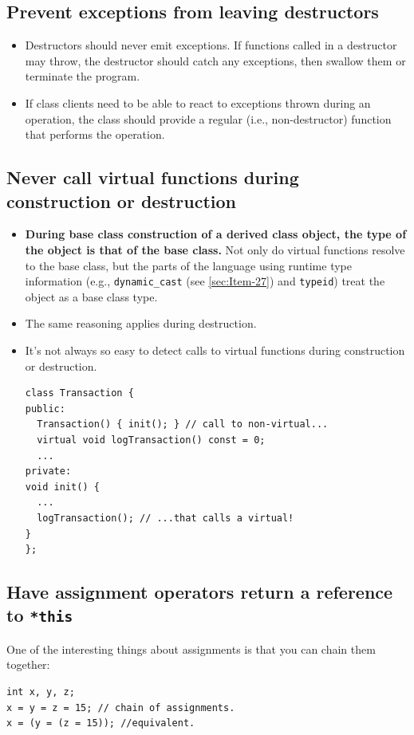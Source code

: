 \documentclass[a4paper,twoside]{article}
\theoremstyle{definition}
\theoremstyle{remark}
\numberwithin{equation}{section}
\let\OldTexttt\texttt
\renewcommand{\texttt}[1]{{\color{blue} \OldTexttt{#1}}}
\begin{document}
\subsection{Prevent exceptions from leaving destructors}
\label{sec:Item-8}

\begin{itemize}
\item  Destructors should never emit exceptions. If functions called in a
destructor may throw, the destructor should catch any exceptions,
then swallow them or terminate the program.
\item If class clients need to be able to react to exceptions thrown during
an operation, the class should provide a regular (i.e.,
non-destructor) function that performs the operation.
\end{itemize}


\subsection{Never call virtual functions during construction or
  destruction}
\label{sec:Item-9}

\begin{itemize}
\item \textbf{During base class construction of a derived class object, the
  type of the object is that of the base class.}  Not only do virtual
functions resolve to the base class, but the
parts of the language using runtime type information (e.g.,
\texttt{dynamic\_cast} (see \ref{sec:Item-27}) and \texttt{typeid})
treat the object as a base class type.
\item The same reasoning applies during destruction.
\item It's not always so easy to detect calls to virtual functions
  during construction or destruction.
\begin{verbatim}
class Transaction {
public:
  Transaction() { init(); } // call to non-virtual...
  virtual void logTransaction() const = 0;
  ...
private:
void init() {
  ...
  logTransaction(); // ...that calls a virtual!
}
};
\end{verbatim}
\end{itemize}

\subsection{Have assignment operators return a reference to
  \texttt{*this}}
\label{sec:Item-10}

One of the interesting things about assignments is that you can chain
them together:
\begin{verbatim}
int x, y, z;
x = y = z = 15; // chain of assignments.
x = (y = (z = 15)); //equivalent.
\end{verbatim}
\end{document}
